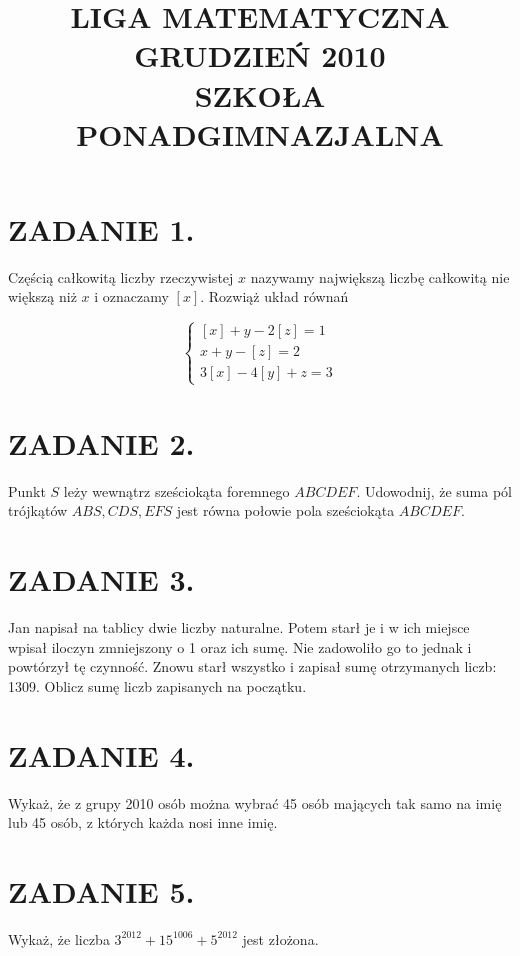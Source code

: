 \documentclass[10pt]{article}
\title{LIGA MATEMATYCZNA \\
 GRUDZIEŃ 2010 \\
 SZKOŁA PONADGIMNAZJALNA }
\author{}
\date{}
\begin{document}
\maketitle
\section*{ZADANIE 1.}
Częścią całkowitą liczby rzeczywistej \(x\) nazywamy największą liczbę całkowitą nie większą niż \(x\) i oznaczamy \([x]\). Rozwiąż układ równań

\[
\left\{\begin{array}{l}
{[x]+y-2[z]=1} \\
x+y-[z]=2 \\
3[x]-4[y]+z=3
\end{array}\right.
\]

\section*{ZADANIE 2.}
Punkt \(S\) leży wewnątrz sześciokąta foremnego \(A B C D E F\). Udowodnij, że suma pól trójkątów \(A B S, C D S, E F S\) jest równa połowie pola sześciokąta \(A B C D E F\).

\section*{ZADANIE 3.}
Jan napisał na tablicy dwie liczby naturalne. Potem starł je i w ich miejsce wpisał iloczyn zmniejszony o 1 oraz ich sumę. Nie zadowoliło go to jednak i powtórzył tę czynność. Znowu starł wszystko i zapisał sumę otrzymanych liczb: 1309. Oblicz sumę liczb zapisanych na początku.

\section*{ZADANIE 4.}
Wykaż, że z grupy 2010 osób można wybrać 45 osób mających tak samo na imię lub 45 osób, z których każda nosi inne imię.

\section*{ZADANIE 5.}
Wykaż, że liczba \(3^{2012}+15^{1006}+5^{2012}\) jest złożona.
\end{document}
